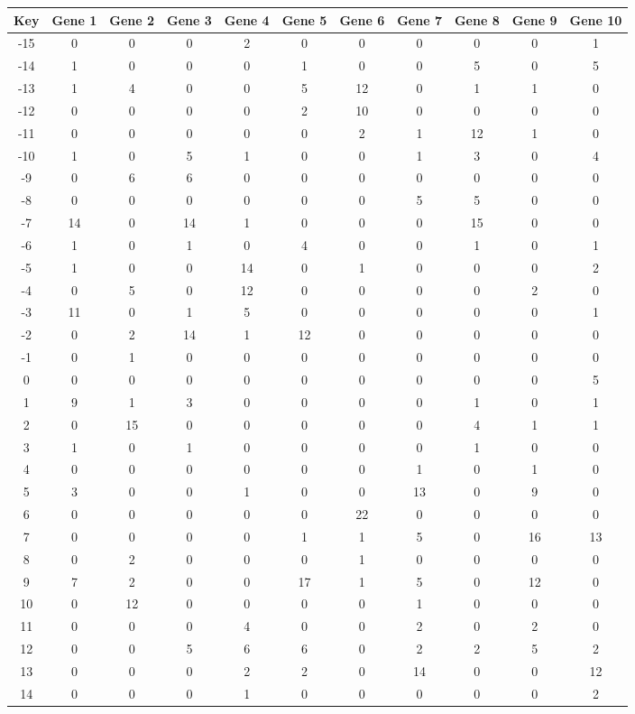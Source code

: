 \begin{tabular}{|c|c|c|c|c|c|c|c|c|c|c|}
\hline
Key & Gene 1 & Gene 2 & Gene 3 & Gene 4 & Gene 5 & Gene 6 & Gene 7 & Gene 8 & Gene 9 & Gene 10 \\
\hline
-15 & 0 & 0 & 0 & 2 & 0 & 0 & 0 & 0 & 0 & 1 \\
-14 & 1 & 0 & 0 & 0 & 1 & 0 & 0 & 5 & 0 & 5 \\
-13 & 1 & 4 & 0 & 0 & 5 & 12 & 0 & 1 & 1 & 0 \\
-12 & 0 & 0 & 0 & 0 & 2 & 10 & 0 & 0 & 0 & 0 \\
-11 & 0 & 0 & 0 & 0 & 0 & 2 & 1 & 12 & 1 & 0 \\
-10 & 1 & 0 & 5 & 1 & 0 & 0 & 1 & 3 & 0 & 4 \\
-9 & 0 & 6 & 6 & 0 & 0 & 0 & 0 & 0 & 0 & 0 \\
-8 & 0 & 0 & 0 & 0 & 0 & 0 & 5 & 5 & 0 & 0 \\
-7 & 14 & 0 & 14 & 1 & 0 & 0 & 0 & 15 & 0 & 0 \\
-6 & 1 & 0 & 1 & 0 & 4 & 0 & 0 & 1 & 0 & 1 \\
-5 & 1 & 0 & 0 & 14 & 0 & 1 & 0 & 0 & 0 & 2 \\
-4 & 0 & 5 & 0 & 12 & 0 & 0 & 0 & 0 & 2 & 0 \\
-3 & 11 & 0 & 1 & 5 & 0 & 0 & 0 & 0 & 0 & 1 \\
-2 & 0 & 2 & 14 & 1 & 12 & 0 & 0 & 0 & 0 & 0 \\
-1 & 0 & 1 & 0 & 0 & 0 & 0 & 0 & 0 & 0 & 0 \\
0 & 0 & 0 & 0 & 0 & 0 & 0 & 0 & 0 & 0 & 5 \\
1 & 9 & 1 & 3 & 0 & 0 & 0 & 0 & 1 & 0 & 1 \\
2 & 0 & 15 & 0 & 0 & 0 & 0 & 0 & 4 & 1 & 1 \\
3 & 1 & 0 & 1 & 0 & 0 & 0 & 0 & 1 & 0 & 0 \\
4 & 0 & 0 & 0 & 0 & 0 & 0 & 1 & 0 & 1 & 0 \\
5 & 3 & 0 & 0 & 1 & 0 & 0 & 13 & 0 & 9 & 0 \\
6 & 0 & 0 & 0 & 0 & 0 & 22 & 0 & 0 & 0 & 0 \\
7 & 0 & 0 & 0 & 0 & 1 & 1 & 5 & 0 & 16 & 13 \\
8 & 0 & 2 & 0 & 0 & 0 & 1 & 0 & 0 & 0 & 0 \\
9 & 7 & 2 & 0 & 0 & 17 & 1 & 5 & 0 & 12 & 0 \\
10 & 0 & 12 & 0 & 0 & 0 & 0 & 1 & 0 & 0 & 0 \\
11 & 0 & 0 & 0 & 4 & 0 & 0 & 2 & 0 & 2 & 0 \\
12 & 0 & 0 & 5 & 6 & 6 & 0 & 2 & 2 & 5 & 2 \\
13 & 0 & 0 & 0 & 2 & 2 & 0 & 14 & 0 & 0 & 12 \\
14 & 0 & 0 & 0 & 1 & 0 & 0 & 0 & 0 & 0 & 2 \\
\hline
\end{tabular}